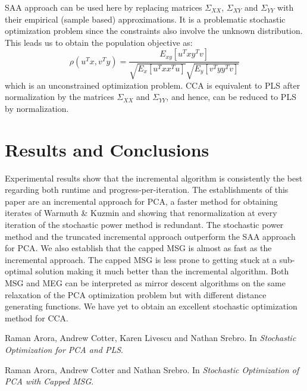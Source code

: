 \documentclass{article}
\begin{document}
SAA approach can be used here by replacing matrices $\Sigma_{XX}$, $\Sigma_{XY}$ and $\Sigma_{YY}$ with their empirical (sample based) approximations. It is a problematic stochastic optimization problem since the constraints also involve the unknown distribution.  This leads us to obtain the population objective as:
\begin{equation}
    \rho\left( u^{T}x,v^{T}y\right) =\dfrac {E_{xy}\left[ u^{T}xy^{T}v\right] }{\sqrt {E_{x}\left[ u^{T}xx^{T}u\right] }\sqrt {E_{y}\left[ v^{T}yy^{T}v\right] }}
\end{equation}
which is an unconstrained optimization problem. CCA is equivalent to PLS after normalization by the matrices $\Sigma_{XX}$ and $\Sigma_{YY}$, and hence, can be reduced to PLS by normalization.

\section{Results and Conclusions}
Experimental results show that the incremental algorithm is consistently the best regarding both runtime and progress-per-iteration. The establishments of this paper are an incremental approach for PCA, a faster method for obtaining iterates of Warmuth \& Kuzmin and showing that renormalization at every iteration of the stochastic power method is redundant. The stochastic power method and the truncated incremental approach outperform the SAA approach for PCA. We also establish that the capped MSG is almost as fast as the incremental approach. The capped MSG is less prone to getting stuck at a sub-optimal solution making it much better than the incremental algorithm. Both MSG and MEG can be interpreted as mirror descent algorithms on the same relaxation of the PCA optimization problem but with different distance generating functions. We have yet to obtain an excellent stochastic optimization method for CCA. 


  


\begin{thebibliography}{1}

Raman Arora, Andrew Cotter, Karen Livescu and Nathan Srebro.
\newblock In {\em Stochastic Optimization for PCA and PLS}.

Raman Arora, Andrew Cotter and Nathan Srebro.
\newblock In {\em Stochastic Optimization of PCA with Capped MSG}.

\end{thebibliography}
\end{document}

